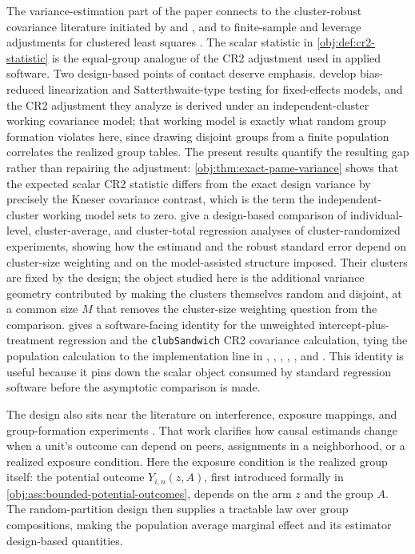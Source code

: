 The variance-estimation part of the paper connects to the cluster-robust covariance literature initiated by \citet{White1980} and \citet{LiangZeger1986}, and to finite-sample and leverage adjustments for clustered least squares \citep{BellMcCaffrey2002,CameronMiller2015,Abadie2023}. The scalar statistic in \cref{obj:def:cr2-statistic} is the equal-group analogue of the CR2 adjustment used in applied software. Two design-based points of contact deserve emphasis. \citet{PustejovskyTipton2018} develop bias-reduced linearization and Satterthwaite-type testing for fixed-effects models, and the CR2 adjustment they analyze is derived under an independent-cluster working covariance model; that working model is exactly what random group formation violates here, since drawing disjoint groups from a finite population correlates the realized group tables. The present results quantify the resulting gap rather than repairing the adjustment: \cref{obj:thm:exact-pame-variance} shows that the expected scalar CR2 statistic differs from the exact design variance by precisely the Kneser covariance contrast, which is the term the independent-cluster working model sets to zero. \citet{SuDing2021} give a design-based comparison of individual-level, cluster-average, and cluster-total regression analyses of cluster-randomized experiments, showing how the estimand and the robust standard error depend on cluster-size weighting and on the model-assisted structure imposed. Their clusters are fixed by the design; the object studied here is the additional variance geometry contributed by making the clusters themselves random and disjoint, at a common size \(M\) that removes the cluster-size weighting question from the comparison.  gives a software-facing identity for the unweighted intercept-plus-treatment regression and the \texttt{clubSandwich} CR2 covariance calculation, tying the population calculation to the implementation line in \citet{PustejovskyTipton2018}, \citet{Zeileis2004}, \citet{Zeileis2006}, \citet{ZeileisKollGraham2020}, \citet{ClubSandwich2026}, and \citet{Sandwich2026}. This identity is useful because it pins down the scalar object consumed by standard regression software before the asymptotic comparison is made.

The design also sits near the literature on interference, exposure mappings, and group-formation experiments \citep{Sobel2006,HudgensHalloran2008,TchetgenTchetgen2012,Manski2013,LiuHudgens2014,AronowSamii2017,Ugander2013,Eckles2017,Athey2018,Li2019,Xu2021,Wang2025,Samii2023,Gao2025}. That work clarifies how causal estimands change when a unit's outcome can depend on peers, assignments in a neighborhood, or a realized exposure condition. Here the exposure condition is the realized group itself: the potential outcome \(Y_{i,n}(z,A)\), first introduced formally in \cref{obj:ass:bounded-potential-outcomes}, depends on the arm \(z\) and the group \(A\). The random-partition design then supplies a tractable law over group compositions, making the population average marginal effect  and its estimator  design-based quantities.

